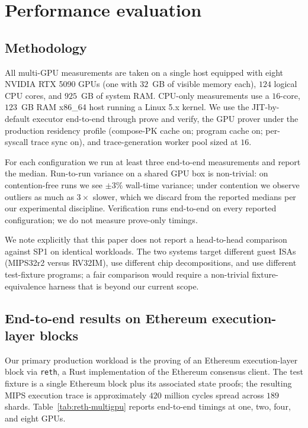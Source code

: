 \section{Performance evaluation}
\label{sec:performance}

\subsection{Methodology}

All multi-GPU measurements are taken on a single host equipped with eight NVIDIA RTX 5090 GPUs (one with $32$~GB of visible memory each), $124$ logical CPU cores, and $925$~GB of system RAM. CPU-only measurements use a $16$-core, $123$~GB RAM x86\_64 host running a Linux 5.x kernel. We use the JIT-by-default executor end-to-end through prove and verify, the GPU prover under the production residency profile (compose-PK cache on; program cache on; per-syscall trace sync on), and trace-generation worker pool sized at $16$.

For each configuration we run at least three end-to-end measurements and report the median. Run-to-run variance on a shared GPU box is non-trivial: on contention-free runs we see $\pm 3\%$ wall-time variance; under contention we observe outliers as much as $3\times$ slower, which we discard from the reported medians per our experimental discipline. Verification runs end-to-end on every reported configuration; we do not measure prove-only timings.

We note explicitly that this paper does not report a head-to-head comparison against SP1 on identical workloads. The two systems target different guest ISAs (MIPS32r2 versus RV32IM), use different chip decompositions, and use different test-fixture programs; a fair comparison would require a non-trivial fixture-equivalence harness that is beyond our current scope.

\subsection{End-to-end results on Ethereum execution-layer blocks}

Our primary production workload is the proving of an Ethereum execution-layer block via \texttt{reth}, a Rust implementation of the Ethereum consensus client. The test fixture is a single Ethereum block plus its associated state proofs; the resulting MIPS execution trace is approximately $420$ million cycles spread across $189$ shards. Table~\ref{tab:reth-multigpu} reports end-to-end timings at one, two, four, and eight GPUs.

